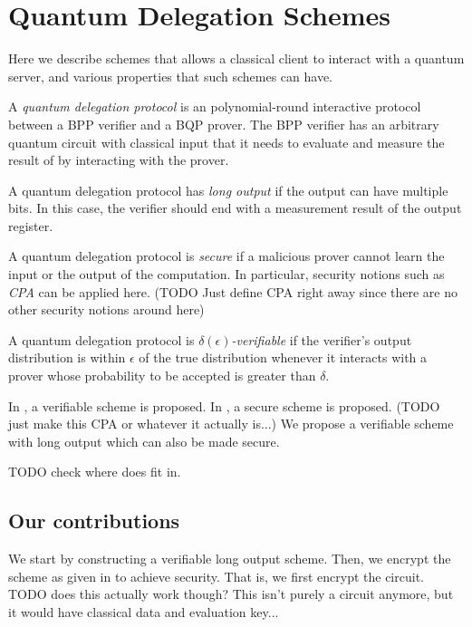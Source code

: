 \section{Quantum Delegation Schemes}

Here we describe schemes that allows a classical client to interact with a quantum server, and various properties that such schemes can have.

\begin{definition}
	A \emph{quantum delegation protocol} is an polynomial-round interactive protocol between a BPP verifier and a BQP prover. The BPP verifier has an arbitrary quantum circuit with classical input that it needs to evaluate and measure the result of by interacting with the prover.
\end{definition}

\begin{definition}
	A quantum delegation protocol has \emph{long output} if the output can have multiple bits. In this case, the verifier should end with a measurement result of the output register.
\end{definition}

\begin{definition}
	A quantum delegation protocol is \emph{secure} if a malicious prover cannot learn the input or the output of the computation. In particular, security notions such as \emph{CPA} can be applied here. (TODO Just define CPA right away since there are no other security notions around here)
\end{definition}

\begin{definition}
	A quantum delegation protocol is \emph{$\delta(\epsilon)$-verifiable} if the verifier's output distribution is within $\epsilon$ of the true distribution whenever it interacts with a prover whose probability to be accepted is greater than $\delta$.
\end{definition}

In \cite{mahadev_delegation}, a verifiable scheme is proposed. In \cite{mahadev_qfhe}, a secure scheme is proposed. (TODO just make this CPA or whatever it actually is...) We propose a verifiable scheme with long output which can also be made secure.

TODO check where does \cite{1904.06320} fit in.

\subsection{Our contributions}

We start by constructing a verifiable long output scheme. Then, we encrypt the scheme as given in \cite{mahadev_delegation} to achieve security. That is, we first encrypt the circuit. TODO does this actually work though? This isn't purely a circuit anymore, but it would have classical data and evaluation key...
